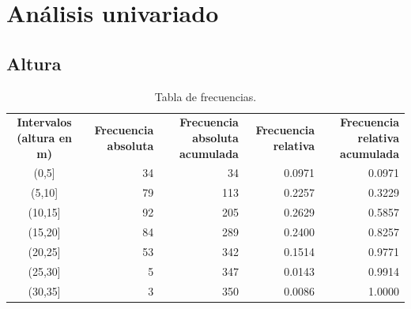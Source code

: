 \documentclass[11pt]{article}
\begin{document}

\newpage
\section{Análisis univariado}

\subsection{Altura}

\begin{table}[h!]
  \begin{center}
    \begin{tabular}{| c | r | r | r | r |}
      \hline
      \multirow{3}{3cm}{\centering\textbf{Intervalos (altura en m)}} & 
      \multirow{3}{3cm}{\centering\textbf{Frecuencia absoluta}} & 
      \multirow{3}{3cm}{\centering\textbf{Frecuencia absoluta acumulada}} &
      \multirow{3}{3cm}{\centering\textbf{Frecuencia relativa}} & 
      \multirow{3}{3cm}{\centering\textbf{Frecuencia relativa acumulada}} \\
      & & & & \\
      & & & & \\ \hline
      (0,5] & 34 & 34 & 0.0971 & 0.0971 \\ \hline
      (5,10] & 79 & 113 & 0.2257 & 0.3229 \\ \hline
      (10,15] & 92 & 205 & 0.2629 & 0.5857 \\ \hline
      (15,20] & 84 & 289 & 0.2400 & 0.8257 \\ \hline
      (20,25] & 53 & 342 & 0.1514 & 0.9771 \\ \hline
      (25,30] & 5 & 347 & 0.0143 & 0.9914 \\ \hline
      (30,35] & 3 & 350 & 0.0086 & 1.0000 \\ \hline
    \end{tabular}
    \caption{Tabla de frecuencias.}
    \label{tab:tablaAltura}
  \end{center}
\end{table}
\end{document}
